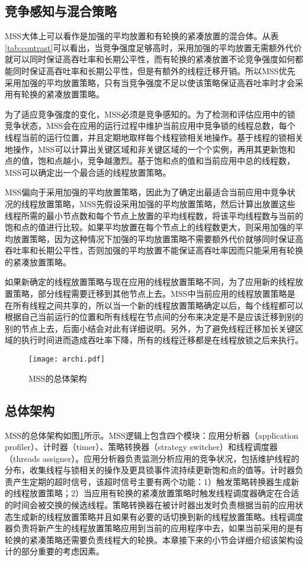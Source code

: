 \subsection{竞争感知与混合策略}
MSS大体上可以看作是加强的平均放置和有轮换的紧凑放置的混合体。从表\ref{tab:contrast}可以看出，当竞争强度足够高时，采用加强的平均放置无需额外代价就可以同时保证高吞吐率和长期公平性，而有轮换的紧凑放置不论竞争强度如何都能同时保证高吞吐率和长期公平性，但是有额外的线程迁移开销。所以MSS优先采用加强的平均放置策略，只有当竞争强度不足以使该策略保证高吞吐率时才会采用有轮换的紧凑放置策略。

为了适应竞争强度的变化，MSS必须是竞争感知的。为了检测和评估应用中的锁竞争状态，MSS会在应用的运行过程中维护当前应用中竞争锁的线程总数，每个线程当前的运行位置，并且定期地取样每个线程锁相关地操作。基于线程的锁相关地操作，MSS可以计算出关键区域和非关键区域的一个个实例，再用其更新饱和点的值，饱和点越小，竞争越激烈。基于饱和点的值和当前应用中总的线程数，MSS可以确定出一个最合适的线程放置策略。

MSS偏向于采用加强的平均放置策略，因此为了确定出最适合当前应用中竞争状况的线程放置策略，MSS先假设采用加强的平均放置策略，然后计算出放置这些线程所需的最小节点数和每个节点上放置的平均线程数，将该平均线程数与当前的饱和点的值进行比较。如果平均放置在每个节点上的线程数更大，则采用加强的平均放置策略，因为这种情况下加强的平均放置策略不需要额外代价就够同时保证高吞吐率和长期公平性，否则加强的平均放置不能保证高吞吐率因而只能采用有轮换的紧凑放置策略。

如果新确定的线程放置策略与现在应用的线程放置策略不同，为了应用新的线程放置策略，部分线程需要迁移到其他节点上去。MSS中当前应用的线程放置策略是在所有线程之间共享的，所以当一个新的线程放置策略确定以后，每个线程都可以根据自己当前运行的位置和所有线程在节点间的分布来决定是不是应该迁移到别的别的节点上去，后面小结会对此有详细说明。另外，为了避免线程迁移加长关键区域的执行时间进而造成吞吐率下降，所有的线程迁移都是在线程放锁之后来执行。

\begin{figure}[t]
	\centering
	\texttt{[image: archi.pdf]}
	\caption{MSS的总体架构}
	\label{Fig:archi}
\end{figure}

\subsection{总体架构}
MSS的总体架构如图\ref{Fig:archi}所示。MSS逻辑上包含四个模块：应用分析器（application profiler）、计时器（timer）、策略转换器（strategy switcher）和线程调度器（threads assigner）。应用分析器负责监测分析应用的竞争状况，包括维护线程的分布，收集线程与锁相关的操作及更具锁事件流持续更新饱和点的值等。计时器负责产生定期的超时信号，该超时信号主要有两个功能：1）触发策略转换器生成新的线程放置策略；2）当应用有轮换的紧凑放置策略时触发线程调度器确定在合适的时间会被交换的候选线程。策略转换器在被计时器出发时负责根据当前的应用状态生成新的线程放置策略并且如果有必要的话切换到新的线程放置策略。线程调度器负责将新产生的线程放置策略应用到当前的应用程序中去，如果当前采用的是有轮换的紧凑策略还需要负责线程大的轮换。本章接下来的小节会详细介绍该架构设计的部分重要的考虑因素。

